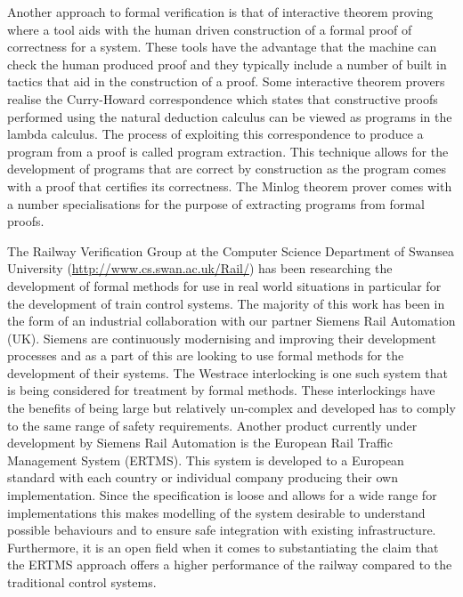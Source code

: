 Another approach to formal verification is that of interactive theorem proving \cite{HG09,SSD06} where a tool aids with the human driven construction of a formal proof of correctness for a system. These tools have the advantage that the machine can check the human produced proof and they typically include a number of built in tactics that aid in the construction of a proof. Some interactive theorem provers realise the Curry-Howard correspondence \cite{HC34, HC58, WH80} which states that constructive proofs performed using the natural deduction calculus can be viewed as programs in the lambda calculus.  The process of exploiting this correspondence to produce a program from a proof is called program extraction. This technique allows for the development of programs that are correct by construction as the program comes with a proof that certifies its correctness. The Minlog theorem prover comes with a number specialisations for the purpose of extracting programs from formal proofs.

The Railway Verification Group at the Computer Science Department of Swansea University (\url{http://www.cs.swan.ac.uk/Rail/}) has been researching the development of formal methods for use in real world situations in particular for the development of train control systems. The majority of this work has been in the form of an industrial collaboration with our partner Siemens Rail Automation (UK). Siemens are continuously modernising and improving their development processes and as a part of this are looking to use formal methods for the development of their systems. The Westrace interlocking is one such system that is being considered for treatment by formal methods. These interlockings have the benefits of being large but relatively un-complex and developed has to comply to the same range of safety requirements.  Another product currently under development by Siemens Rail Automation is the European Rail Traffic Management System (ERTMS). This system is developed to a European  standard with each country or individual company producing their own implementation. Since the specification is loose and allows for a wide range for implementations this makes modelling of the system desirable to understand possible behaviours and to ensure safe integration with existing infrastructure. Furthermore, it is an open field  when it comes to substantiating the claim that the ERTMS approach offers a higher performance of the railway compared to the traditional control systems.




